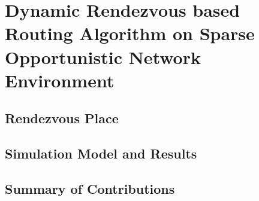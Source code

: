 \chapter{Dynamic Rendezvous based Routing Algorithm on Sparse Opportunistic Network Environment}
\label{drra}

\section{Rendezvous Place}
\label{drra:Rendezvous Place}



\section{Simulation Model and Results}
\label{drra:Simulation Model and Results}




\section{Summary of Contributions}
\label{drra:Summary of Contributions}






